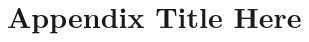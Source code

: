 
\chapter{Appendix Title Here} %

\label{AppendixA} %

\listoftables %
\label{lst:tabs}

\listoffigures %
\label{lst:figs}


%
%
